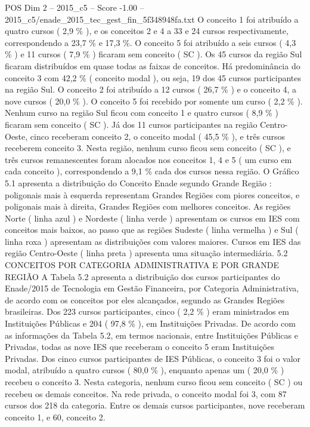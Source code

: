 \begin{textsample}{POS Dim 2 – 2015\_c5 – Score -1.00 – 2015\_c5/enade\_2015\_tec\_gest\_fin\_5f348948fa.txt}
O conceito 1 foi atribuído a quatro cursos ( 2,9 \% ), e os conceitos 2 e 4 a 33 e 24 cursos respectivamente, correspondendo a 23,7 \% e 17,3 \%.
O conceito 5 foi atribuído a seis cursos ( 4,3 \% ) e 11 cursos ( 7,9 \% ) ficaram sem conceito ( SC ).
Os 45 cursos da região Sul ficaram distribuídos em quase todas as faixas de conceitos.
Há predominância do conceito 3 com 42,2 \% ( conceito modal ), ou seja, 19 dos 45 cursos participantes na região Sul.
O conceito 2 foi atribuído a 12 cursos ( 26,7 \% ) e o conceito 4, a nove cursos ( 20,0 \% ).
O conceito 5 foi recebido por somente um curso ( 2,2 \% ).
Nenhum curso na região Sul ficou com conceito 1 e quatro cursos ( 8,9 \% ) ficaram sem conceito ( SC ).
Já dos 11 cursos participantes na região Centro-Oeste, cinco receberam conceito 2, o conceito modal ( 45,5 \% ), e três cursos receberem conceito 3.
Nesta região, nenhum curso ficou sem conceito ( SC ), e três cursos remanescentes foram alocados nos conceitos 1, 4 e 5 ( um curso em cada conceito ), correspondendo a 9,1 \% cada dos cursos nessa região.
O Gráfico 5.1 apresenta a distribuição do Conceito Enade segundo Grande Região : poligonais mais à esquerda representam Grandes Regiões com piores conceitos, e poligonais mais à direita, Grandes Regiões com melhores conceitos.
As regiões Norte ( linha azul ) e Nordeste ( linha verde ) apresentam os cursos em IES com conceitos mais baixos, ao passo que as regiões Sudeste ( linha vermelha ) e Sul ( linha roxa ) apresentam as distribuições com valores maiores.
Cursos em IES das região Centro-Oeste ( linha preta ) apresenta uma situação intermediária. 5.2 CONCEITOS POR CATEGORIA ADMINISTRATIVA E POR GRANDE REGIÃO A Tabela 5.2 apresenta a distribuição dos cursos participantes do Enade/2015 de Tecnologia em Gestão Financeira, por Categoria Administrativa, de acordo com os conceitos por eles alcançados, segundo as Grandes Regiões brasileiras.
Dos 223 cursos participantes, cinco ( 2,2 \% ) eram ministrados em Instituições Públicas e 204 ( 97,8 \% ), em Instituições Privadas.
De acordo com as informações da Tabela 5.2, em termos nacionais, entre Instituições Públicas e Privadas, todas as nove IES que receberam o conceito 5 eram Instituições Privadas.
Dos cinco cursos participantes de IES Públicas, o conceito 3 foi o valor modal, atribuído a quatro cursos ( 80,0 \% ), enquanto apenas um ( 20,0 \% ) recebeu o conceito 3.
Nesta categoria, nenhum curso ficou sem conceito ( SC ) ou recebeu os demais conceitos.
Na rede privada, o conceito modal foi 3, com 87 cursos dos 218 da categoria.
Entre os demais cursos participantes, nove receberam conceito 1, e 60, conceito 2.

\end{textsample}
